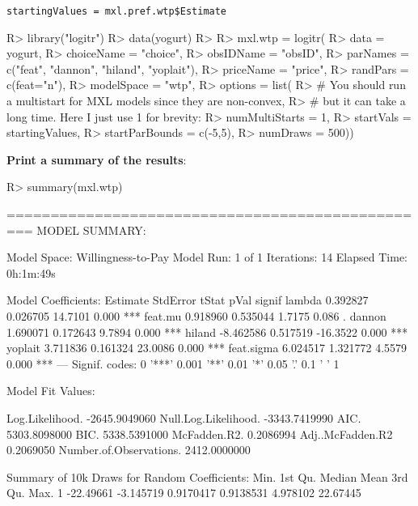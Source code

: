 \documentclass[article]{jss}
\begin{document}
\texttt{startingValues\ =\ mxl.pref.wtp\$Estimate}

\begin{CodeChunk}

\begin{CodeInput}
R> library("logitr")
R> data(yogurt)
R> 
R> mxl.wtp = logitr(
R>   data       = yogurt,
R>   choiceName = "choice",
R>   obsIDName  = "obsID",
R>   parNames   = c("feat", "dannon", "hiland", "yoplait"),
R>   priceName  = "price",
R>   randPars   = c(feat="n"),
R>   modelSpace = "wtp",
R>   options = list(
R>   # You should run a multistart for MXL models since they are non-convex,
R>   # but it can take a long time. Here I just use 1 for brevity:
R>     numMultiStarts = 1,
R>     startVals      = startingValues,
R>     startParBounds = c(-5,5),
R>     numDraws       = 500))
\end{CodeInput}
\end{CodeChunk}

\textbf{Print a summary of the results}:

\begin{CodeChunk}

\begin{CodeInput}
R> summary(mxl.wtp)
\end{CodeInput}

\begin{CodeOutput}
=================================================
MODEL SUMMARY: 
                                
Model Space:  Willingness-to-Pay
Model Run:                1 of 1
Iterations:                   14
Elapsed Time:          0h:1m:49s

Model Coefficients: 
            Estimate StdError    tStat  pVal signif
lambda      0.392827 0.026705  14.7101 0.000    ***
feat.mu     0.918960 0.535044   1.7175 0.086      .
dannon      1.690071 0.172643   9.7894 0.000    ***
hiland     -8.462586 0.517519 -16.3522 0.000    ***
yoplait     3.711836 0.161324  23.0086 0.000    ***
feat.sigma  6.024517 1.321772   4.5579 0.000    ***
---
Signif. codes:  0 '***' 0.001 '**' 0.01 '*' 0.05 '.' 0.1 ' ' 1

Model Fit Values: 
                                     
Log.Likelihood.         -2645.9049060
Null.Log.Likelihood.    -3343.7419990
AIC.                     5303.8098000
BIC.                     5338.5391000
McFadden.R2.                0.2086994
Adj..McFadden.R2            0.2069050
Number.of.Observations.  2412.0000000

Summary of 10k Draws for Random Coefficients: 
       Min.   1st Qu.    Median      Mean  3rd Qu.     Max.
1 -22.49661 -3.145719 0.9170417 0.9138531 4.978102 22.67445
\end{CodeOutput}
\end{CodeChunk}
\end{document}
